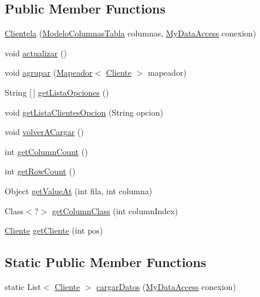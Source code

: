 \subsection*{Public Member Functions}
\begin{DoxyCompactItemize}
\item 
\mbox{\hyperlink{classclientes_1_1_clientela_af168d8a11882d39c22e0e18bd9689deb}{Clientela}} (\mbox{\hyperlink{classclientes_1_1_modelo_columnas_tabla}{Modelo\+Columnas\+Tabla}} columnas, \mbox{\hyperlink{classconexion_s_q_l_1_1_my_data_access}{My\+Data\+Access}} conexion)
\item 
void \mbox{\hyperlink{classclientes_1_1_clientela_acea670c44be086472e0ccd9c3f2c1f67}{actualizar}} ()
\item 
void \mbox{\hyperlink{classclientes_1_1_clientela_ae120fcd5a51e1d17d11e3b36ca1d8290}{agrupar}} (\mbox{\hyperlink{interfaceclientes_1_1_mapeador}{Mapeador}}$<$ \mbox{\hyperlink{classclientes_1_1_cliente}{Cliente}} $>$ mapeador)
\item 
String \mbox{[}$\,$\mbox{]} \mbox{\hyperlink{classclientes_1_1_clientela_a036492cd5e2bba079ef0874b9693d9e1}{get\+Lista\+Opciones}} ()
\item 
void \mbox{\hyperlink{classclientes_1_1_clientela_a8275e9ef86c96a9070cff779e5a0169e}{get\+Lista\+Clientes\+Opcion}} (String opcion)
\item 
void \mbox{\hyperlink{classclientes_1_1_clientela_a99c3c767c734c205696aaf32131e0119}{volver\+A\+Cargar}} ()
\item 
int \mbox{\hyperlink{classclientes_1_1_clientela_a43ca9c21c992f1bd25544b5cc6d1ed0e}{get\+Column\+Count}} ()
\item 
int \mbox{\hyperlink{classclientes_1_1_clientela_a2637748da710e9aa18044fd614d3e1cc}{get\+Row\+Count}} ()
\item 
Object \mbox{\hyperlink{classclientes_1_1_clientela_a58c7e701ceb7a1eb87d4aa996fc1e546}{get\+Value\+At}} (int fila, int columna)
\item 
Class$<$?$>$ \mbox{\hyperlink{classclientes_1_1_clientela_af7d9f77f6b5b1582fcdb4df4b92551fd}{get\+Column\+Class}} (int column\+Index)
\item 
\mbox{\hyperlink{classclientes_1_1_cliente}{Cliente}} \mbox{\hyperlink{classclientes_1_1_clientela_a1d531f14dc541569b84f1f72c760d376}{get\+Cliente}} (int pos)
\end{DoxyCompactItemize}
\subsection*{Static Public Member Functions}
\begin{DoxyCompactItemize}
\item 
static List$<$ \mbox{\hyperlink{classclientes_1_1_cliente}{Cliente}} $>$ \mbox{\hyperlink{classclientes_1_1_clientela_a2892095286ae0f52220099674a8b90d8}{cargar\+Datos}} (\mbox{\hyperlink{classconexion_s_q_l_1_1_my_data_access}{My\+Data\+Access}} conexion)
\end{DoxyCompactItemize}


